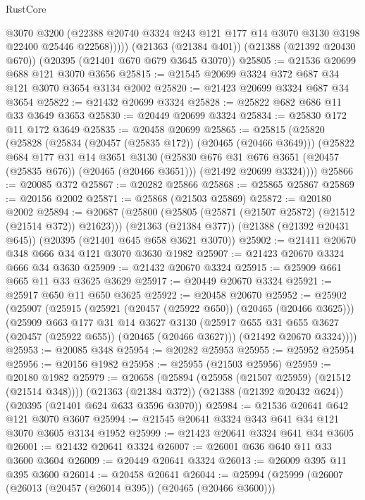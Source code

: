 \begin{lexlean}{RustCore}
\begin{coremodule}
            @3070
            @3200
            (@22388 @20740 @3324 @243 @121 @177 @14 @3070 @3130 @3198 @22400 @25446 @22568)))))
    (@21363 (@21384 @401))
    (@21388 (@21392 @20430 @670))
    (@20395 (@21401 @670 @679 @3645 @3070))
@25805 := @21536 @20699 @688 @121 @3070 @3656
@25815 := @21545 @20699 @3324 @372 @687 @34 @121 @3070 @3654 @3134 @2002
@25820 := @21423 @20699 @3324 @687 @34 @3654
@25822 := @21432 @20699 @3324
@25828 := @25822 @682 @686 @11 @33 @3649 @3653
@25830 := @20449 @20699 @3324
@25834 := @25830 @172 @11 @172 @3649
@25835 := @20458 @20699
@25865 := @25815
    (@25820
      (@25828
        (@25834 (@20457 (@25835 @172)) (@20465 (@20466 @3649)))
        (@25822
          @684
          @177
          @31
          @14
          @3651
          @3130
          (@25830 @676 @31 @676 @3651 (@20457 (@25835 @676)) (@20465 (@20466 @3651)))
          (@21492 @20699 @3324))))
@25866 := @20085 @372
@25867 := @20282 @25866
@25868 := @25865 @25867
@25869 := @20156 @2002
@25871 := @25868 (@21503 @25869)
@25872 := @20180 @2002
@25894 := @20687
    (@25800 (@25805 (@25871 (@21507 @25872) (@21512 (@21514 @372)) @21623)))
    (@21363 (@21384 @377))
    (@21388 (@21392 @20431 @645))
    (@20395 (@21401 @645 @658 @3621 @3070))
@25902 := @21411 @20670 @348 @666 @34 @121 @3070 @3630 @1982
@25907 := @21423 @20670 @3324 @666 @34 @3630
@25909 := @21432 @20670 @3324
@25915 := @25909 @661 @665 @11 @33 @3625 @3629
@25917 := @20449 @20670 @3324
@25921 := @25917 @650 @11 @650 @3625
@25922 := @20458 @20670
@25952 := @25902
    (@25907
      (@25915
        (@25921 (@20457 (@25922 @650)) (@20465 (@20466 @3625)))
        (@25909
          @663
          @177
          @31
          @14
          @3627
          @3130
          (@25917 @655 @31 @655 @3627 (@20457 (@25922 @655)) (@20465 (@20466 @3627)))
          (@21492 @20670 @3324))))
@25953 := @20085 @348
@25954 := @20282 @25953
@25955 := @25952 @25954
@25956 := @20156 @1982
@25958 := @25955 (@21503 @25956)
@25959 := @20180 @1982
@25979 := @20658
    (@25894 (@25958 (@21507 @25959) (@21512 (@21514 @348))))
    (@21363 (@21384 @372))
    (@21388 (@21392 @20432 @624))
    (@20395 (@21401 @624 @633 @3596 @3070))
@25984 := @21536 @20641 @642 @121 @3070 @3607
@25994 := @21545 @20641 @3324 @343 @641 @34 @121 @3070 @3605 @3134 @1952
@25999 := @21423 @20641 @3324 @641 @34 @3605
@26001 := @21432 @20641 @3324
@26007 := @26001 @636 @640 @11 @33 @3600 @3604
@26009 := @20449 @20641 @3324
@26013 := @26009 @395 @11 @395 @3600
@26014 := @20458 @20641
@26044 := @25994
    (@25999
      (@26007
        (@26013 (@20457 (@26014 @395)) (@20465 (@20466 @3600)))

\end{coremodule}
\end{lexlean}
